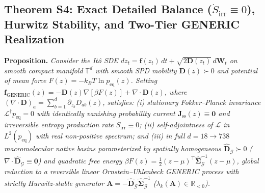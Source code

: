\documentclass[10pt,letterpaper]{article}
\begin{document}
\subsection{Theorem S4: Exact Detailed Balance ($\dot{S}_{\mathrm{irr}} \equiv 0$), Hurwitz Stability, and Two-Tier GENERIC Realization}
\textbf{Proposition.} \textit{Consider the It\^o SDE $dz_t = \mathbf{f}(z_t)\,dt + \sqrt{2\mathbf{D}(z_t)}\,d\mathbf{W}_t$ on smooth compact manifold $\mathbb{T}^d$ with smooth SPD mobility $\mathbf{D}(z) \succ 0$ and potential of mean force $F(z) = -k_B T \ln p_{\mathrm{eq}}(z)$. Setting $\mathbf{f}_{\mathrm{GENERIC}}(z) = -\mathbf{D}(z)\nabla[\beta F(z)] + \nabla\!\cdot\!\mathbf{D}(z)$, where $(\nabla\!\cdot\!\mathbf{D})_a = \sum_{b=1}^d \partial_{z_b} D_{ab}(z)$, satisfies: (i) stationary Fokker--Planck invariance $\mathcal{L}^\dagger p_{\mathrm{eq}} = 0$ with identically vanishing probability current $\bm{J}_{\mathrm{ss}}(z) \equiv \mathbf{0}$ and irreversible entropy production rate $\dot{S}_{\mathrm{irr}} \equiv 0$; (ii) self-adjointness of $\mathcal{L}$ in $L^2(p_{\mathrm{eq}})$ with real non-positive spectrum; and (iii) in full $d = 18 \to 738$ macromolecular native basins parameterized by spatially homogeneous $\hat{\mathbf{D}}_{\mathcal{G}} \succ 0$ ($\nabla\!\cdot\!\hat{\mathbf{D}}_{\mathcal{G}} \equiv \mathbf{0}$) and quadratic free energy $\beta F(z) = \frac{1}{2}(z-\mu)^\top\hat{\bm{\Sigma}}_{\mathcal{G}}^{-1}(z-\mu)$, global reduction to a reversible linear Ornstein--Uhlenbeck GENERIC process with strictly Hurwitz-stable generator $\mathbf{A} = -\hat{\mathbf{D}}_{\mathcal{G}}\hat{\bm{\Sigma}}_{\mathcal{G}}^{-1}$ ($\lambda_k(\mathbf{A}) \in \mathbb{R}_{<0}$).}
\end{document}
